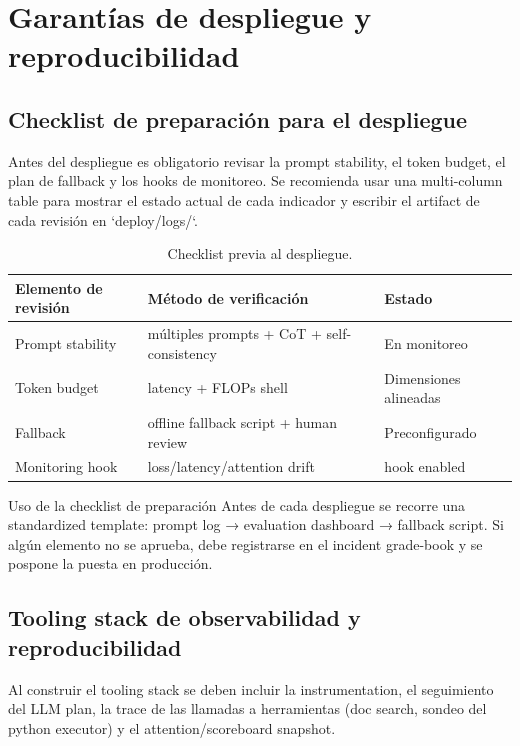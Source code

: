 \section{Garantías de despliegue y reproducibilidad}

\subsection{Checklist de preparación para el despliegue}

Antes del despliegue es obligatorio revisar la prompt stability, el token budget, el plan de fallback y los hooks de monitoreo. Se recomienda usar una multi-column table para mostrar el estado actual de cada indicador y escribir el artifact de cada revisión en `deploy/logs/`.

\begin{table}[H]
\centering
\begin{tabular}{p{4cm}p{5cm}p{3cm}}
\toprule
Elemento de revisión & Método de verificación & Estado \\
\midrule
Prompt stability & múltiples prompts + CoT + self-consistency & En monitoreo \\
Token budget & latency + FLOPs shell & Dimensiones alineadas \\
Fallback & offline fallback script + human review & Preconfigurado \\
Monitoring hook & loss/latency/attention drift & hook enabled \\
\bottomrule
\end{tabular}
\caption{Checklist previa al despliegue.}
\end{table}

\begin{importantbox}{Uso de la checklist de preparación}
Antes de cada despliegue se recorre una standardized template: prompt log → evaluation dashboard → fallback script. Si algún elemento no se aprueba, debe registrarse en el incident grade-book y se pospone la puesta en producción.
\end{importantbox}

\subsection{Tooling stack de observabilidad y reproducibilidad}

Al construir el tooling stack se deben incluir la instrumentation, el seguimiento del LLM plan, la trace de las llamadas a herramientas (doc search, sondeo del python executor) y el attention/scoreboard snapshot.

